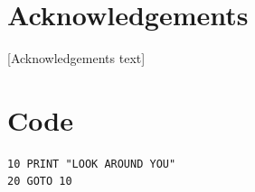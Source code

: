 \documentclass[a4paper,11pt]{report}
\newcommand{\linespacing}{1.5}
\renewcommand{\baselinestretch}{\linespacing}
\begin{document}
\chapter*{Acknowledgements}
\renewcommand{\baselinestretch}{\linespacing}
\small\normalsize
[Acknowledgements text]

\newpage
{}
\tableofcontents
\listoftables
{}
{}
\listoffigures
{}
{}

\newpage
{}













\clearpage
{}
{}


\appendix

\chapter{Code}
\label{app:code}

\begin{verbatim}
10 PRINT "LOOK AROUND YOU"
20 GOTO 10
\end{verbatim}


\end{document}
